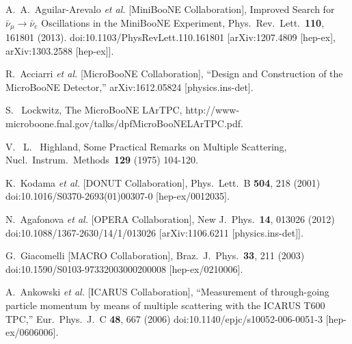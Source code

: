 \documentclass[a4paper,11pt]{article}
\begin{document}
\begin{thebibliography}{99}




  A.~A.~Aguilar-Arevalo {\it et al.} 
  [MiniBooNE Collaboration],
  Improved Search for $\bar \nu_\mu \rightarrow \bar \nu_e$ Oscillations in the MiniBooNE Experiment,
  Phys.\ Rev.\ Lett.\  {\bf 110}, 161801 (2013).
  doi:10.1103/PhysRevLett.110.161801
  [arXiv:1207.4809 [hep-ex], arXiv:1303.2588 [hep-ex]].

  R.~Acciarri {\it et al.} [MicroBooNE Collaboration],
  ``Design and Construction of the MicroBooNE Detector,''
  arXiv:1612.05824 [physics.ins-det].

  S. ~Lockwitz, 
  The MicroBooNE LArTPC,
  http://www-microboone.fnal.gov/talks/dpfMicroBooNELArTPC.pdf.

  V. ~L. ~Highland, 
  Some Practical Remarks on Multiple Scattering, 
  Nucl.\ Instrum.\ Methods\ {\bf 129} (1975)
  104-120.
 

  K.~Kodama {\it et al.} [DONUT Collaboration],
  Phys.\ Lett.\ B {\bf 504}, 218 (2001)
  doi:10.1016/S0370-2693(01)00307-0
  [hep-ex/0012035].

  N.~Agafonova {\it et al.} [OPERA Collaboration],
  New J.\ Phys.\  {\bf 14}, 013026 (2012)
  doi:10.1088/1367-2630/14/1/013026
  [arXiv:1106.6211 [physics.ins-det]].

 
  G.~Giacomelli [MACRO Collaboration],
  Braz.\ J.\ Phys.\  {\bf 33}, 211 (2003)
  doi:10.1590/S0103-97332003000200008
  [hep-ex/0210006].

  A.~Ankowski {\it et al.} [ICARUS Collaboration],
  ``Measurement of through-going particle momentum by means of multiple scattering with the ICARUS T600 TPC,''
  Eur.\ Phys.\ J.\ C {\bf 48}, 667 (2006)
  doi:10.1140/epjc/s10052-006-0051-3
  [hep-ex/0606006].


\end{thebibliography}
\end{document}
